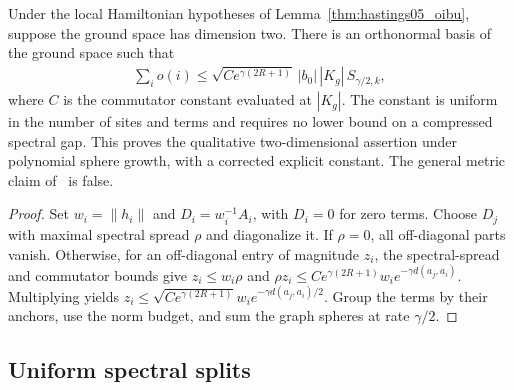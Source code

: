 \begin{lemma}
    \label{thm:hastings05_two_dim_uniform_sum}
    \leanok
    Under the local Hamiltonian hypotheses of Lemma~\ref{thm:hastings05_oibu},
    suppose the ground space has dimension two. There is an orthonormal basis
    of the ground space such that
    \begin{align*}
        \sum_i o(i)\le
        \sqrt{Ce^{\gamma(2R+1)}}\,|b_0|\,|K_g|\,S_{\gamma/2,k},
    \end{align*}
    where $C$ is the commutator constant evaluated at $|K_g|$.
    The constant is uniform in the number of sites and terms and requires no
    lower bound on a compressed spectral gap. This proves the qualitative
    two-dimensional assertion under polynomial sphere growth, with a corrected
    explicit constant\cite{gap:hastings05_two_dim_ground_basis}.
    The general metric claim of~\cite[lines 1678--1694]{Hastings2006Solving}
    is false\cite{gap:hastings05_tree_basis_counterexample}.
\end{lemma}
\begin{proof}\leanok
    Set $w_i=\|h_i\|$ and $D_i=w_i^{-1}A_i$, with $D_i=0$ for zero terms.
    Choose $D_j$ with maximal spectral spread $\rho$ and diagonalize it.
    If $\rho=0$, all off-diagonal parts vanish. Otherwise, for an off-diagonal
    entry of magnitude $z_i$, the spectral-spread and commutator bounds give
    $z_i\le w_i\rho$ and
    $\rho z_i\le Ce^{\gamma(2R+1)}w_i e^{-\gamma d(a_j,a_i)}$.
    Multiplying yields
    $z_i\le\sqrt{Ce^{\gamma(2R+1)}}w_i e^{-\gamma d(a_j,a_i)/2}$.
    Group the terms by their anchors, use the norm budget, and sum the graph
    spheres at rate $\gamma/2$.
\end{proof}


\subsection{Uniform spectral splits}


